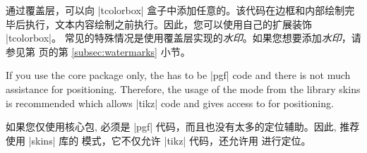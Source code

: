 通过覆盖层，可以向 |tcolorbox| 盒子中添加任意的。该代码在边框和内部绘制完毕后执行，文本内容绘制之前执行。因此，您可以使用自己的扩展装饰 |tcolorbox|。
常见的特殊情况是使用覆盖层实现的\emph{水印}。如果您想要添加\emph{水印}，请参见第 \pageref{subsec:watermarks} 页的第 \ref{subsec:watermarks} 小节。


\begin{marker}
 If you use the core package only, the  has to be |pgf| code
 and there is not much assistance for positioning.
 Therefore, the usage of the  mode from the library skins
 is recommended which allows |tikz| code and gives access to
  for positioning.

如果您仅使用核心包,  必须是 |pgf| 代码，而且也没有太多的定位辅助。因此, 推荐使用 |skins| 库的  模式，它不仅允许 |tikz| 代码，还允许用  进行定位。
\end{marker}


